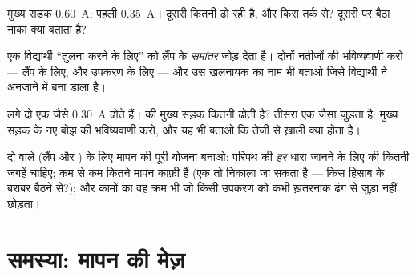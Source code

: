 \begin{exercise}[$\star\star$]\label{exo:g8:intensity-ammeter:9}
मुख्य सड़क \qty{0.60}{A}; पहली  \qty{0.35}{A}। दूसरी  कितनी
ढो रही है, और किस तर्क से? दूसरी  पर बैठा नाका क्या बताता है?
\end{exercise}

\begin{exercise}[$\star\star$]\label{exo:g8:intensity-ammeter:10}
एक विद्यार्थी ``तुलना करने के लिए''  को लैंप के
\emph{समांतर} जोड़ देता है। दोनों नतीजों की भविष्यवाणी करो --- लैंप के
लिए, और उपकरण के लिए --- और उस खलनायक का नाम भी बताओ जिसे विद्यार्थी
ने अनजाने में बना डाला है।
\end{exercise}

\begin{exercise}[$\star\star$]\label{exo:g8:intensity-ammeter:11}
 लगे दो एक जैसे  \qty{0.30}{A} ढोते हैं।  की मुख्य
सड़क कितनी ढोती है?  तीसरा एक जैसा  जुड़ता है: मुख्य
सड़क के नए बोझ की भविष्यवाणी करो, और यह भी बताओ कि तेज़ी से ख़ाली
क्या होता है।
\end{exercise}

\begin{exercise}[$\star\star\star$]\label{exo:g8:intensity-ammeter:12}
दो  वाले  (लैंप और ) के लिए मापन की पूरी योजना
बनाओ: परिपथ की \emph{हर} धारा जानने के लिए  की कितनी जगहें चाहिए;
कम से कम कितने मापन काफ़ी हैं (एक तो निकाला जा सकता है --- किस हिसाब
के बराबर बैठने से?); और कामों का वह क्रम भी जो किसी उपकरण को कभी
ख़तरनाक ढंग से जुड़ा नहीं छोड़ता।
\end{exercise}

\section{समस्या: मापन की मेज़}

